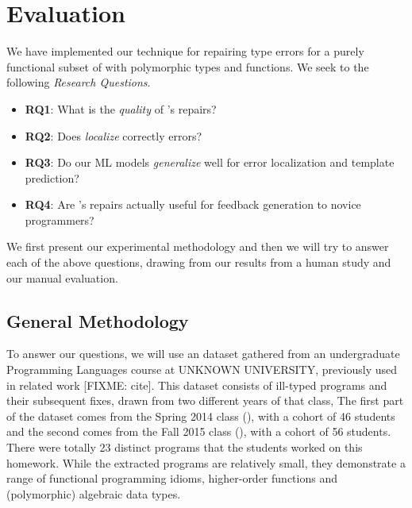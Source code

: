 \section{Evaluation}
\label{sec:eval}

We have implemented our technique for repairing type errors for a purely
functional subset of \ocaml with polymorphic types and functions. We seek to the
following \emph{Research Questions}.

\begin{itemize}
    \item \textbf{RQ1}: What is the \emph{quality} of \toolname's repairs?
    \item \textbf{RQ2}: Does \toolname \emph{localize} correctly errors?
    \item \textbf{RQ3}: Do our ML models \emph{generalize} well for error
    localization and template prediction?
    \item \textbf{RQ4}: Are \toolname's repairs actually useful for feedback
    generation to novice programmers?
\end{itemize}

We first present our experimental methodology and then we will try to answer
each of the above questions, drawing from our results from a human study and our
manual evaluation.


\subsection{General Methodology}
\label{subsec:gen_method}
To answer our questions, we will use an \ocaml dataset gathered from an
undergraduate Programming Languages course at UNKNOWN UNIVERSITY, previously
used in related work [FIXME: cite]. This dataset consists of ill-typed programs
and their subsequent fixes, drawn from two different years of that class, The
first part of the dataset comes from the Spring 2014 class (\SPRING), with a
cohort of 46 students and the second comes from the Fall 2015 class (\FALL),
with a cohort of 56 students. There were totally 23 distinct programs that the
students worked on this homework. While the extracted programs are relatively
small, they demonstrate a range of functional programming idioms, \eg
higher-order functions and (polymorphic) algebraic data types.

